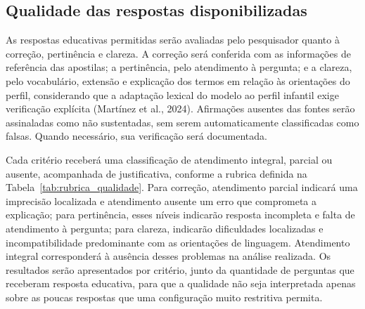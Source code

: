 \documentclass[12pt,openany,oneside,a4paper,english,brazil]{abntex2}
\begin{document}
\subsection{Qualidade das respostas disponibilizadas}\label{subsec:qualidade_respostas}

As respostas educativas permitidas serão avaliadas pelo pesquisador quanto à correção, pertinência e clareza. A correção será conferida com as informações de referência das apostilas; a pertinência, pelo atendimento à pergunta; e a clareza, pelo vocabulário, extensão e explicação dos termos em relação às orientações do perfil, considerando que a adaptação lexical do modelo ao perfil infantil exige verificação explícita (Martínez et al., 2024). Afirmações ausentes das fontes serão assinaladas como não sustentadas, sem serem automaticamente classificadas como falsas. Quando necessário, sua verificação será documentada.

Cada critério receberá uma classificação de atendimento integral, parcial ou ausente, acompanhada de justificativa, conforme a rubrica definida na Tabela~\ref{tab:rubrica_qualidade}. Para correção, atendimento parcial indicará uma imprecisão localizada e atendimento ausente um erro que comprometa a explicação; para pertinência, esses níveis indicarão resposta incompleta e falta de atendimento à pergunta; para clareza, indicarão dificuldades localizadas e incompatibilidade predominante com as orientações de linguagem. Atendimento integral corresponderá à ausência desses problemas na análise realizada. Os resultados serão apresentados por critério, junto da quantidade de perguntas que receberam resposta educativa, para que a qualidade não seja interpretada apenas sobre as poucas respostas que uma configuração muito restritiva permita.
\end{document}
